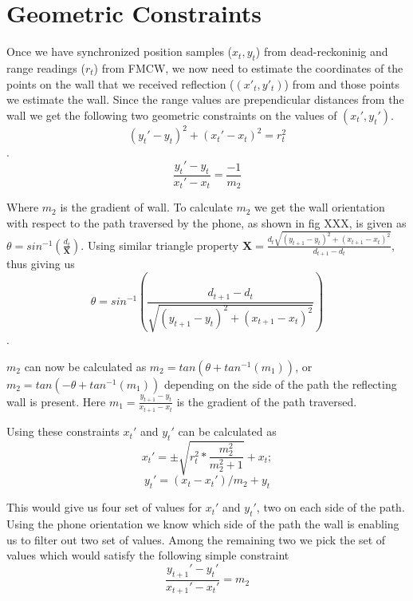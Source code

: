 \section{Geometric Constraints}\label{sec:geometric}
Once we have synchronized position samples ($x_t,y_t$) from dead-reckoninig and range readings ($r_t$) from FMCW, we now need to estimate the coordinates of the points on the wall that we received reflection ($(x'_t,y'_t)$) from and those points we estimate the wall.
Since the range values are prependicular distances from the wall we get the following two geometric constraints on the values of $(x_t',y_t')$.
$$(y_t' - y_t)^2 + (x_t' - x_t)^2 = r_t^2$$.
$$\frac{y_t' - y_t}{x_t' - x_t} = \frac{-1}{m_2}$$ 

Where $m_2$ is the gradient of wall. To calculate $m_2$ we get the wall orientation with respect to the path traversed by the phone, as shown in fig XXX,  is given as $\theta = sin^{-1}(\frac{d_t}{\textbf{X}})$. Using similar triangle property $\textbf{X} = \frac{d_t \sqrt{(y_{t+1} - y_t)^2 + (x_{t+1} - x_t)^2}}{d_{t+1} - d_t}$, thus giving us 
$$\theta = sin^{-1}(\frac{d_{t+1}-d_t}{\sqrt{(y_{t+1} - y_t)^2 + (x_{t+1} - x_t)^2}})$$.

$m_2$ can now be calculated as $m_2 = tan(\theta + tan^{-1}(m_1))$, or $m_2 = tan(-\theta + tan^{-1}(m_1))$ depending on the side of the path the reflecting wall is present. Here $m_1 = \frac{y_{t+1} - y_t}{x_{t+1} - x_t}$ is the gradient of the path traversed.

Using these constraints $x_t'$ and $y_t'$ can be calculated as
$$x_t' = \pm \sqrt{r_t^2 * \frac{m_2^2}{m_2^2+1}} + x_t; $$
$$y_t' = (x_t-x_t')/m_2 + y_t$$

This would give us four set of values for $x_t'$ and $y_t'$, two on each side of the path. Using the phone orientation we know which side of the path the wall is enabling us to filter out two set of values. Among the remaining two we pick the set of values which would satisfy the following simple constraint
$$\frac{y_{t+1}' - y_t'}{x_{t+1}' - x_t'} = m_2$$
